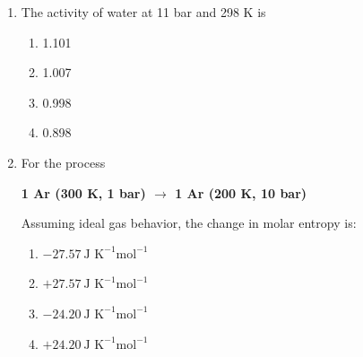\documentclass[journal,12pt,onecolumn]{IEEEtran}
\theoremstyle{remark}
\begin{document}
\begin{enumerate}
The major product [X] is:

\begin{multicols}{2}
\begin{enumerate}
    \item racemic trans-1,2-cyclohexanediol diacetate
    \item optically active trans-1,2-cyclohexanediol diacetate
    \item racemic cis-1,2-cyclohexanediol diacetate
    \item optically active cis-1,2-cyclohexanediol diacetate
\end{enumerate}
\end{multicols}

 

\item    \hspace{0.5 cm} The activity of water at 11 bar and 298 K is  \hfill{}

\begin{multicols}{2}
\begin{enumerate}
    \item 1.101
    \item 1.007
    \item 0.998
    \item 0.898
\end{enumerate}
\end{multicols}

 

\item    \hspace{0.5 cm} For the process  \hfill{}

\begin{center}
\textbf{1 Ar (300 K, 1 bar) $\rightarrow$ 1 Ar (200 K, 10 bar)}
\end{center}

Assuming ideal gas behavior, the change in molar entropy is:

\begin{multicols}{2}
\begin{enumerate}
    \item $-27.57 \ \text{J K}^{-1} \text{mol}^{-1}$
    \item $+27.57 \ \text{J K}^{-1} \text{mol}^{-1}$
    \item $-24.20 \ \text{J K}^{-1} \text{mol}^{-1}$
    \item $+24.20 \ \text{J K}^{-1} \text{mol}^{-1}$
\end{enumerate}
\end{multicols}


\end{enumerate}
\end{document}
